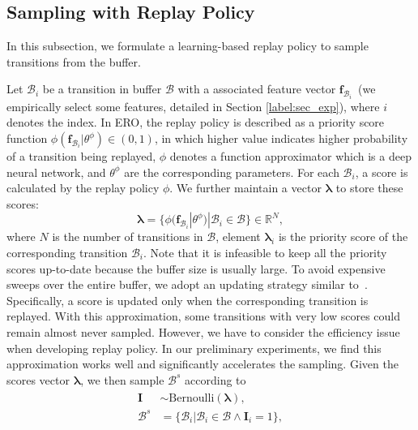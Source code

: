 \documentclass{article}
\begin{document}
\subsection{Sampling with Replay Policy}
\label{label:sec3-1}

In this subsection, we formulate a learning-based replay policy to sample transitions from the buffer.

Let $\mathcal{B}_i$ be a transition in buffer $\mathcal{B}$ with a associated feature vector $\textbf{f}_{\mathcal{B}_i}$~(we empirically select some features, detailed in Section \ref{label:sec_exp}), where $i$ denotes the index. In ERO, the replay policy is described as a priority score function $\phi(\textbf{f}_{\mathcal{B}_i}|\theta^\phi) \in (0, 1)$, in which higher value indicates higher probability of a transition being replayed, $\phi$ denotes a function approximator which is a deep neural network, and $\theta^\phi$ are the corresponding parameters. For each $\mathcal{B}_i$, a score is calculated by the replay policy $\phi$. We further maintain a vector $\bm{\lambda}$ to store these scores:
\begin{equation}
    \bm{\lambda} = \{\phi(\textbf{f}_{\mathcal{B}_i}|\theta^\phi) | \mathcal{B}_i \in \mathcal{B} \} \in \mathbb{R}^{N},
\end{equation}
where $N$ is the number of transitions in $\mathcal{B}$, element $\bm{\lambda}_i$ is the priority score of the corresponding transition $\mathcal{B}_i$. Note that it is infeasible to keep all the priority scores up-to-date because the buffer size is usually large. To avoid expensive sweeps over the entire buffer, we adopt an updating strategy similar to~\cite{schaul2016prioritized}. Specifically, a score is updated only when the corresponding transition is replayed. With this approximation, some transitions with very low scores could remain almost never sampled. However, we have to consider the efficiency issue when developing replay policy. In our preliminary experiments, we find this approximation works well and significantly accelerates the sampling. Given the scores vector $\bm{\lambda}$, we then sample $\mathcal{B}^{s}$ according to 
\begin{align}
\begin{split}
\label{label:eqn2}
    \textbf{I} & \sim \mathrm{Bernoulli}(\bm{\lambda}), \\
    \mathcal{B}^{s} & = \{\mathcal{B}_i | \mathcal{B} _i \in \mathcal{B}\wedge \textbf{I}_i = 1 \},
\end{split}
\end{align}
\end{document}

